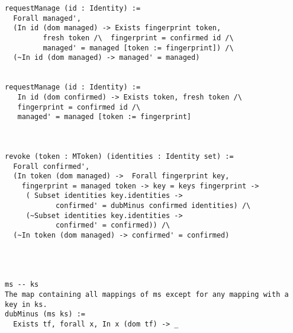 \documentclass{article}
\begin{document}
\begin{verbatim}
requestManage (id : Identity) :=
  Forall managed', 
  (In id (dom managed) -> Exists fingerprint token, 
         fresh token /\  fingerprint = confirmed id /\
         managed' = managed [token := fingerprint]) /\
  (~In id (dom managed) -> managed' = managed)
   

requestManage (id : Identity) :=
   In id (dom confirmed) -> Exists token, fresh token /\
   fingerprint = confirmed id /\
   managed' = managed [token := fingerprint]



revoke (token : MToken) (identities : Identity set) :=
  Forall confirmed', 
  (In token (dom managed) ->  Forall fingerprint key,  
    fingerprint = managed token -> key = keys fingerprint -> 
     ( Subset identities key.identities ->  
            confirmed' = dubMinus confirmed identities) /\
     (~Subset identities key.identities -> 
            confirmed' = confirmed)) /\
  (~In token (dom managed) -> confirmed' = confirmed)




ms -- ks 	
The map containing all mappings of ms except for any mapping with a key in ks.
dubMinus (ms ks) := 
  Exists tf, forall x, In x (dom tf) -> _ 
  

    

\end{verbatim}
\end{document}
